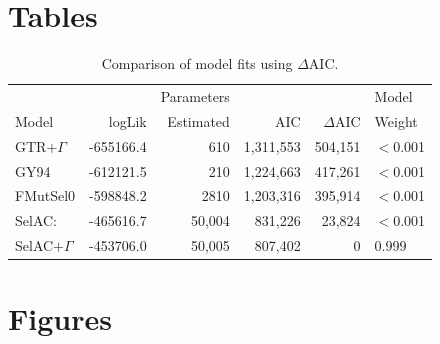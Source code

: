 \documentclass{article}
\newcommand{\DeltaAIC}{\ensuremath{\Delta\text{AIC}}\xspace}
\newcommand{\selac}{SelAC\xspace}
\newcommand{\selacplusgamma}{SelAC$+\Gamma$\xspace}
\begin{document}
\clearpage

\section*{Tables}
  \begin{table}
    \begin{tabular}{lrrrrl}
      &          &Parameters &          &        & Model\\
      Model                 	& logLik   & Estimated &     AIC& \DeltaAIC&  Weight\\\hline
      GTR+$\Gamma$        		& -655166.4&        610& 1,311,553& 504,151&$<$0.001\\
      GY94                  	& -612121.5&        210& 1,224,663& 417,261&$<$0.001\\
      FMutSel0              		& -598848.2&       2810& 1,203,316& 395,914&$<$0.001\\
      \selac:          	        & -465616.7&       50,004&   831,226&  23,824&$<$0.001\\
      \selacplusgamma 	        & -453706.0&       50,005&   807,402&       0& 0.999
    \end{tabular}
    \caption{Comparison of model fits using $\DeltaAIC$.}
    \label{table:modelFits}
\end{table}



\clearpage %

\section*{Figures}
\end{document}
